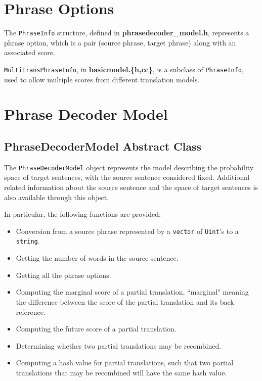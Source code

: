 \documentclass[12pt]{amsart} \usepackage{epsfig} \usepackage{rotating}
\newcommand{\file}{\textbf} \newcommand{\url}{\underline}
\newcommand{\code}{\small\texttt}
\begin{document}
\section{Phrase Options}
The \code{PhraseInfo} structure, defined in \file{phrasedecoder\_model.h},
represents a phrase option, which is a pair (source phrase, target phrase)
along with an associated score.

\code{MultiTransPhraseInfo}, in \file{basicmodel.\{h,cc\}}, is a subclass of
\code{PhraseInfo}, used to allow multiple scores from different translation
models.


\section{Phrase Decoder Model}

\subsection{PhraseDecoderModel Abstract Class}
The \code{PhraseDecoderModel} object represents the model describing the
probability space of target sentences, with the source sentence considered
fixed.  Additional related information about the source sentence and the space
of target sentences is also available through this object.

In particular, the following functions are provided:

\begin{itemize}
\item
Conversion from a source phrase represented by a \code{vector} of \code{Uint}'s
to a \code{string}.

\item
Getting the number of words in the source sentence.

\item
Getting all the phrase options.

\item
Computing the marginal score of a partial translation, ``marginal" meaning the
difference between the score of the partial translation and its back reference.

\item
Computing the future score of a partial translation.

\item
Determining whether two partial translations may be recombined.

\item
Computing a hash value for partial translations, such that two partial
translations that may be recombined will have the same hash value.
\end{itemize}
\end{document}

